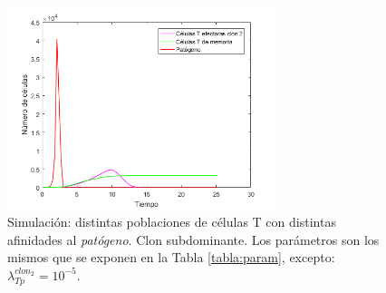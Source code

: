 \begin{figure}[t]
	\centering
	\includegraphics[width=0.7\textwidth]{Imagenes/Simulaciones/unClon}
	\caption{Simulación: distintas poblaciones de células T con distintas afinidades al \textit{patógeno}. Clon subdominante. Los parámetros son los mismos que se exponen en la Tabla \ref{tabla:param}, excepto: $\lambda_{Tp}^{clon_2} = 10^{-5}$.}
	\label{fig:unClon}
\end{figure}

